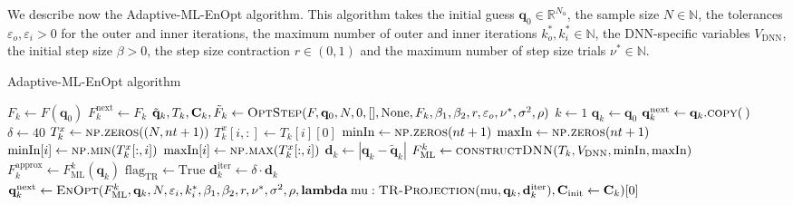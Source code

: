 We describe now the Adaptive-ML-EnOpt algorithm. This algorithm takes the initial guess $\mathbf{q}_0\in\mathbb{R}^{N_u}$, the sample size $N\in\mathbb{N}$, the tolerances $\varepsilon_o,\varepsilon_i>0$ for the outer and inner iterations, the maximum number of outer and inner iterations $k_o^*,k_i^*\in\mathbb{N}$, the DNN-specific variables $V_{\mathrm{DNN}}$, the initial step size $\beta>0$, the step size contraction $r\in(0,1)$ and the maximum number of step size trials $\nu^*\in\mathbb{N}$.
\begin{algorithm}[H]%
\caption{\label{AML-EnOpt}Adaptive-ML-EnOpt algorithm}
\begin{algorithmic}[1]
\State $F_k\gets F(\mathbf{q}_0)$
\State $F^\mathrm{next}_k \gets F_k$
\State $\tilde{\mathbf{q}}_k,T_k,\mathbf{C}_k,\tilde{F}_k\gets\Call{OptStep}{F, \mathbf{q}_0, N, 0, [], \mathrm{None}, F_k, \beta_1, \beta_2, r, \varepsilon_o, \nu^*, \sigma^2, \rho}$
\State $k\gets 1$
\State $\mathbf{q}_k \gets \mathbf{q}_0$
\State $\mathbf{q}^\mathrm{next}_k \gets \mathbf{q}_k.\Call{copy}{\:}$
\State $\delta \gets 40$
\State $T^x_k \gets \Call{np.zeros}{(N, nt+1)}$
\State $T^x_k[i,:] \gets T_k[i][0]$
\EndFor
\State $\mathrm{minIn} \gets \Call{np.zeros}{nt+1}$
\State $\mathrm{maxIn} \gets \Call{np.zeros}{nt+1}$
\State $\mathrm{minIn}[i] \gets \Call{np.min}{T^x_k[:,i]}$
\State $\mathrm{maxIn}[i] \gets \Call{np.max}{T^x_k[:,i]}$
\EndFor
\State $\mathbf{d}_k\gets|\mathbf{q}_k-\tilde{\mathbf{q}}_k|$
\State $F_\mathrm{ML}^k\gets \Call{constructDNN}{T_k, V_\mathrm{DNN}, \mathrm{minIn}, \mathrm{maxIn}}$
\State $F^\mathrm{approx}_k\gets F_\mathrm{ML}^k(\mathbf{q}_k)$
\State $\mathrm{flag}_\mathrm{TR}\gets \mathrm{True}$
\State $\mathbf{d}^\mathrm{iter}_k\gets\delta\cdot\mathbf{d}_k$
\State $\mathbf{q}^\mathrm{next}_k\gets\Call{EnOpt}{F_\mathrm{ML}^k,\mathbf{q}_k,N,\varepsilon_i,k_i^*,\beta_1, \beta_2,r,\nu^*, \sigma^2, \rho, \mathbf{lambda}\:\mathrm{mu}:\protect\Call{TR-Projection}{\mathrm{mu}, \mathbf{q}_k, \mathbf{d}^\mathrm{iter}_k}, \mathbf{C}_\mathrm{init}\gets\mathbf{C}_k}[0]$

\end{algorithmic}
\end{algorithm}
